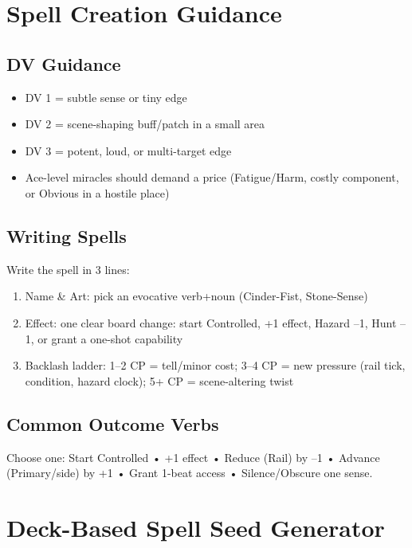 \section{Spell Creation Guidance}

\subsection{DV Guidance}
\begin{itemize}
\item DV 1 = subtle sense or tiny edge
\item DV 2 = scene-shaping buff/patch in a small area
\item DV 3 = potent, loud, or multi-target edge
\item Ace-level miracles should demand a price (Fatigue/Harm, costly component, or Obvious in a hostile place)
\end{itemize}

\subsection{Writing Spells}
Write the spell in 3 lines:
\begin{enumerate}
\item Name \& Art: pick an evocative verb+noun (Cinder-Fist, Stone-Sense)
\item Effect: one clear board change: start Controlled, +1 effect, Hazard --1, Hunt --1, or grant a one-shot capability
\item Backlash ladder: 1--2 CP = tell/minor cost; 3--4 CP = new pressure (rail tick, condition, hazard clock); 5+ CP = scene-altering twist
\end{enumerate}

\subsection{Common Outcome Verbs}
Choose one: Start Controlled • +1 effect • Reduce (Rail) by --1 • Advance (Primary/side) by +1 • Grant 1-beat access • Silence/Obscure one sense.

\section{Deck-Based Spell Seed Generator}

